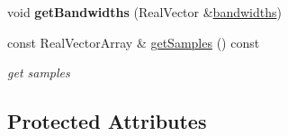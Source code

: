 \begin{DoxyCompactItemize}
\item 
void {\bfseries get\+Bandwidths} (Real\+Vector \&\hyperlink{classPecos_1_1GaussianKDE_ae303fb49034fb553ad86c64be017915f}{bandwidths})\label{classPecos_1_1GaussianKDE_a1435857a2e0f422a4fc6db89d74c9d76}

\item 
const Real\+Vector\+Array \& \hyperlink{classPecos_1_1GaussianKDE_a718ebb2fbd090629dfe8ff9377f5dd55}{get\+Samples} () const \label{classPecos_1_1GaussianKDE_a718ebb2fbd090629dfe8ff9377f5dd55}

\begin{DoxyCompactList}\small\item\em get samples \end{DoxyCompactList}\end{DoxyCompactItemize}
\subsection*{Protected Attributes}
